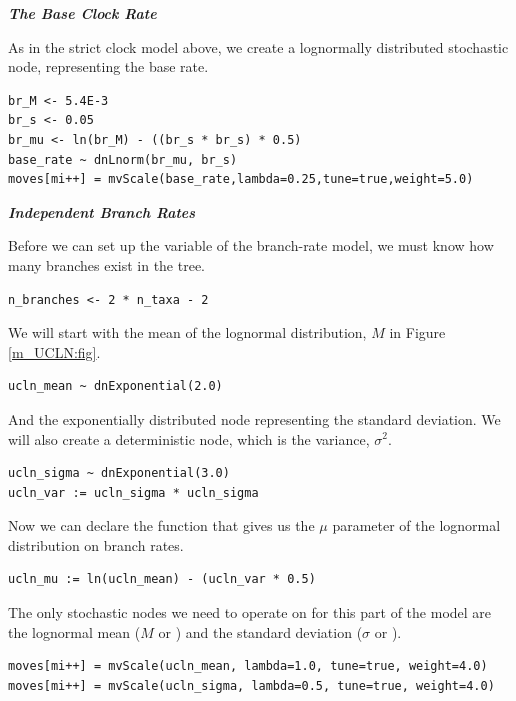 \textbf{\textit{The Base Clock Rate}}

As in the strict clock model above, we create a lognormally distributed stochastic node, representing the base rate.
{\tt \begin{snugshade*}
\begin{lstlisting}
br_M <- 5.4E-3
br_s <- 0.05
br_mu <- ln(br_M) - ((br_s * br_s) * 0.5)
base_rate ~ dnLnorm(br_mu, br_s)
moves[mi++] = mvScale(base_rate,lambda=0.25,tune=true,weight=5.0)
\end{lstlisting}
\end{snugshade*}}

\textbf{\textit{Independent Branch Rates}}

Before we can set up the variable of the branch-rate model, we must know how many branches exist in the tree.
{\tt \begin{snugshade*}
\begin{lstlisting}
n_branches <- 2 * n_taxa - 2
\end{lstlisting}
\end{snugshade*}}

We will start with the mean of the lognormal distribution, $M$ in Figure \ref{m_UCLN:fig}.
{\tt \begin{snugshade*}
\begin{lstlisting}
ucln_mean ~ dnExponential(2.0)
\end{lstlisting}
\end{snugshade*}}

And the exponentially distributed node representing the standard deviation.
We will also create a deterministic node, which is the variance, $\sigma^2$.
{\tt \begin{snugshade*}
\begin{lstlisting}
ucln_sigma ~ dnExponential(3.0)
ucln_var := ucln_sigma * ucln_sigma
\end{lstlisting}
\end{snugshade*}}

Now we can declare the function that gives us the $\mu$ parameter of the lognormal distribution on branch rates.
{\tt \begin{snugshade*}
\begin{lstlisting}
ucln_mu := ln(ucln_mean) - (ucln_var * 0.5)
\end{lstlisting}
\end{snugshade*}}

The only stochastic nodes we need to operate on for this part of the model are the lognormal mean ($M$ or ) and the standard deviation ($\sigma$ or ).
{\tt \begin{snugshade*}
\begin{lstlisting}
moves[mi++] = mvScale(ucln_mean, lambda=1.0, tune=true, weight=4.0)
moves[mi++] = mvScale(ucln_sigma, lambda=0.5, tune=true, weight=4.0)
\end{lstlisting}
\end{snugshade*}}

